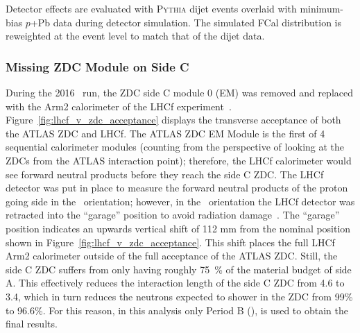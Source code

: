 Detector effects are evaluated with \textsc{Pythia} dijet events overlaid with
minimum-bias $p$+Pb data during detector simulation. The simulated FCal
distribution is reweighted at the event level to match that of the dijet data.

\subsubsection{Missing ZDC Module on Side C}
\label{sec:missing_zdc_mod}
During the 2016 \pxPb\ run, the ZDC side C module 0 (EM) was removed and replaced with the Arm2 calorimeter of the LHCf experiment~\cite{Adriani:2135330}. Figure~\ref{fig:lhcf_v_zdc_acceptance} displays the transverse acceptance of both the ATLAS ZDC and LHCf.  The ATLAS ZDC EM Module is the first of 4 sequential calorimeter modules (counting from the perspective of looking at the ZDCs from the ATLAS interaction point); therefore, the LHCf calorimeter would see forward neutral products before they reach the side C ZDC.  The LHCf detector was put in place to measure the forward neutral products of the proton going side in the \pxPb\ orientation; however, in the \Pbxp\ orientation the LHCf detector was retracted into the ``garage'' position to avoid radiation damage~\cite{Adriani:2135330}.  The ``garage'' position indicates an upwards vertical shift of 112 mm from the nominal position shown in Figure~\ref{fig:lhcf_v_zdc_acceptance}.  This shift places the full LHCf Arm2 calorimeter outside of the full acceptance of the ATLAS ZDC.  Still, the side C ZDC suffers from only having roughly 75~\% of the material budget of side A. This effectively reduces the interaction length of the side C ZDC from 4.6 to 3.4, which in turn reduces the neutrons expected to shower in the ZDC from 99\% to 96.6\%. For this reason, in this analysis only Period B (\pxPb), is used to obtain the final results.


